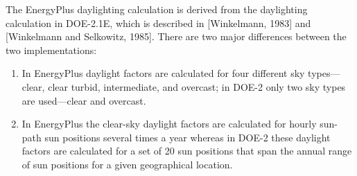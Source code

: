 The EnergyPlus daylighting calculation is derived from the daylighting calculation in DOE-2.1E, which is described in {[}Winkelmann, 1983{]} and {[}Winkelmann and Selkowitz, 1985{]}.
There are two major differences between the two implementations:

\begin{enumerate}
\def\labelenumi{(\arabic{enumi})}
\item
    In EnergyPlus daylight factors are calculated for four different sky types---clear, clear turbid, intermediate, and overcast; in DOE-2 only two sky types are used---clear and overcast.
\item
    In EnergyPlus the clear-sky daylight factors are calculated for hourly sun-path sun positions several times a year
    whereas in DOE-2 these daylight factors are calculated for a set of 20 sun positions that span the annual range of sun positions for a given geographical location.
\end{enumerate}
